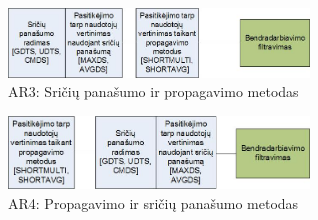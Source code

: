 \documentclass{VUMIFInfMagistrinis}
\begin{document}
\begin{figure}[ht!]
	\centering
	\includegraphics[width=80mm]{architectures/DS Prop.jpg}
	\caption{AR3: Sričių panašumo ir propagavimo metodas}
\end{figure}
\begin{figure}[ht!]
	\centering
	\includegraphics[width=80mm]{architectures/Prop DS.jpg}
	\caption{AR4: Propagavimo ir sričių panašumo metodas}
\end{figure}
\end{document}
